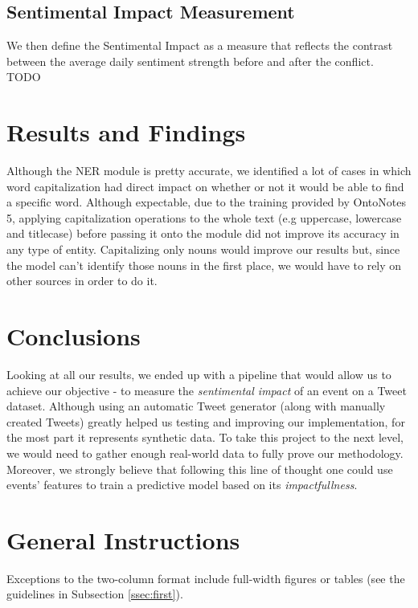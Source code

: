 \documentclass[11pt]{article}
\begin{document}
	\subsection{Sentimental Impact Measurement}
	\label{sub:sentimental_impact_measurement}
	We then define the Sentimental Impact as a measure that reflects the
	contrast between the average daily sentiment strength before and after the
	conflict.
	TODO
	
	\section{Results and Findings}
	Although the NER module is pretty accurate, we identified a lot of cases in which word capitalization had direct impact on whether or not it would be able to find a specific word. Although expectable, due to the training provided by OntoNotes 5, applying capitalization operations to the whole text (e.g uppercase, lowercase and titlecase) before passing it onto the module did not improve its accuracy in any type of entity. Capitalizing only nouns would improve our results but, since the model can't identify those nouns in the first place, we would have to rely on other sources in order to do it.
	
	\section{Conclusions}
	Looking at all our results, we ended up with a pipeline that would allow us to achieve our objective - to measure the \textit{sentimental impact} of an event on a Tweet dataset. Although using an automatic Tweet generator (along with manually created Tweets) greatly helped us testing and improving our implementation, for the most part it represents synthetic data. To take this project to the next level, we would need to gather enough real-world data to fully prove our methodology. Moreover, we strongly believe that following this line of thought one could use events' features to train a predictive model based on its \textit{impactfullness}.
	
	\newpage
	
	
	\section{General Instructions}
	Exceptions to the
	two-column format include full-width figures or tables (see the guidelines in
	Subsection \ref{ssec:first}).
	
\end{document}
